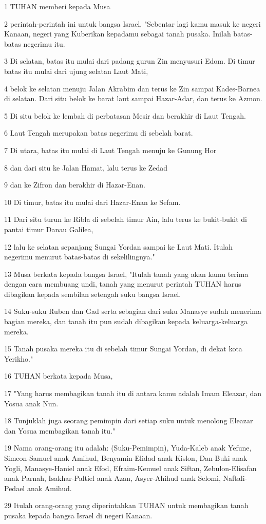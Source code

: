 \par 1 TUHAN memberi kepada Musa
\par 2 perintah-perintah ini untuk bangsa Israel, "Sebentar lagi kamu masuk ke negeri Kanaan, negeri yang Kuberikan kepadamu sebagai tanah pusaka. Inilah batas-batas negerimu itu.
\par 3 Di selatan, batas itu mulai dari padang gurun Zin menyusuri Edom. Di timur batas itu mulai dari ujung selatan Laut Mati,
\par 4 belok ke selatan menuju Jalan Akrabim dan terus ke Zin sampai Kades-Barnea di selatan. Dari situ belok ke barat laut sampai Hazar-Adar, dan terus ke Azmon.
\par 5 Di situ belok ke lembah di perbatasan Mesir dan berakhir di Laut Tengah.
\par 6 Laut Tengah merupakan batas negerimu di sebelah barat.
\par 7 Di utara, batas itu mulai di Laut Tengah menuju ke Gunung Hor
\par 8 dan dari situ ke Jalan Hamat, lalu terus ke Zedad
\par 9 dan ke Zifron dan berakhir di Hazar-Enan.
\par 10 Di timur, batas itu mulai dari Hazar-Enan ke Sefam.
\par 11 Dari situ turun ke Ribla di sebelah timur Ain, lalu terus ke bukit-bukit di pantai timur Danau Galilea,
\par 12 lalu ke selatan sepanjang Sungai Yordan sampai ke Laut Mati. Itulah negerimu menurut batas-batas di sekelilingnya."
\par 13 Musa berkata kepada bangsa Israel, "Itulah tanah yang akan kamu terima dengan cara membuang undi, tanah yang menurut perintah TUHAN harus dibagikan kepada sembilan setengah suku bangsa Israel.
\par 14 Suku-suku Ruben dan Gad serta sebagian dari suku Manasye sudah menerima bagian mereka, dan tanah itu pun sudah dibagikan kepada keluarga-keluarga mereka.
\par 15 Tanah pusaka mereka itu di sebelah timur Sungai Yordan, di dekat kota Yerikho."
\par 16 TUHAN berkata kepada Musa,
\par 17 "Yang harus membagikan tanah itu di antara kamu adalah Imam Eleazar, dan Yosua anak Nun.
\par 18 Tunjuklah juga seorang pemimpin dari setiap suku untuk menolong Eleazar dan Yosua membagikan tanah itu."
\par 19 Nama orang-orang itu adalah: (Suku-Pemimpin), Yuda-Kaleb anak Yefune, Simeon-Samuel anak Amihud, Benyamin-Elidad anak Kislon, Dan-Buki anak Yogli, Manasye-Haniel anak Efod, Efraim-Kemuel anak Siftan, Zebulon-Elisafan anak Parnah, Isakhar-Paltiel anak Azan, Asyer-Ahihud anak Selomi, Naftali-Pedael anak Amihud.
\par 29 Itulah orang-orang yang diperintahkan TUHAN untuk membagikan tanah pusaka kepada bangsa Israel di negeri Kanaan.

